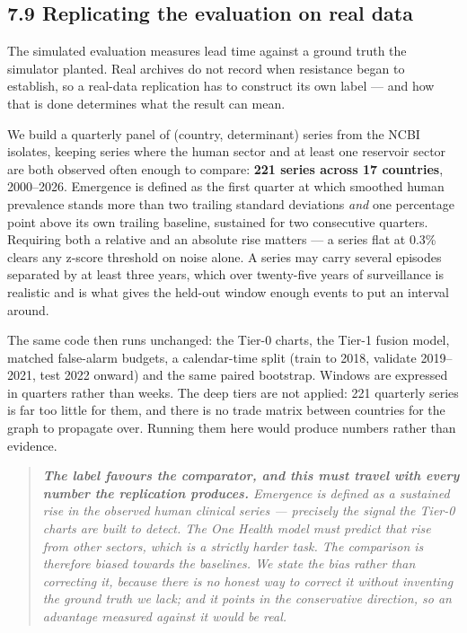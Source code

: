 \documentclass[11pt,a4paper]{article}
\begin{document}
\subsection*{7.9 Replicating the evaluation on real data}

The simulated evaluation measures lead time against a ground truth the simulator planted. Real archives do not record when resistance began to establish, so a real-data replication has to construct its own label — and how that is done determines what the result can mean.

We build a quarterly panel of (country, determinant) series from the NCBI isolates, keeping series where the human sector and at least one reservoir sector are both observed often enough to compare: \textbf{221 series across 17 countries}, 2000–2026. Emergence is defined as the first quarter at which smoothed human prevalence stands more than two trailing standard deviations \emph{and} one percentage point above its own trailing baseline, sustained for two consecutive quarters. Requiring both a relative and an absolute rise matters — a series flat at 0.3\% clears any z-score threshold on noise alone. A series may carry several episodes separated by at least three years, which over twenty-five years of surveillance is realistic and is what gives the held-out window enough events to put an interval around.

The same code then runs unchanged: the Tier-0 charts, the Tier-1 fusion model, matched false-alarm budgets, a calendar-time split (train to 2018, validate 2019–2021, test 2022 onward) and the same paired bootstrap. Windows are expressed in quarters rather than weeks. The deep tiers are not applied: 221 quarterly series is far too little for them, and there is no trade matrix between countries for the graph to propagate over. Running them here would produce numbers rather than evidence.

\begin{quote}\emph{\textbf{The label favours the comparator, and this must travel with every number the replication produces.} Emergence is defined as a sustained rise in the observed human clinical series — precisely the signal the Tier-0 charts are built to detect. The One Health model must predict that rise from other sectors, which is a strictly harder task. The comparison is therefore biased \emph{towards} the baselines. We state the bias rather than correcting it, because there is no honest way to correct it without inventing the ground truth we lack; and it points in the conservative direction, so an advantage measured against it would be real.}\end{quote}
\end{document}
